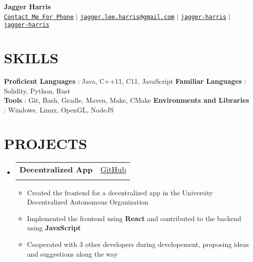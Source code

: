 \documentclass[letterpaper,11pt]{article}
\makeatletter
\newcommand{\resumeItem}[1]{
  \item\small{
    {#1 \vspace{-1pt}}
  }
}
\newcommand{\resumeProjectHeading}[4]{
  \vspace{-1pt}\item
    \begin{tabular*}{\textwidth}[t]{l@{\extracolsep{\fill}}r}
      \textbf{#1} & {\color{dark-grey}\small #2}\vspace{1pt}\\ %
      \textit{#3} & {\color{dark-grey} \small #4}\vspace{1pt}\\ %
    \end{tabular*}\vspace{-20pt}
}
\newcommand{\resumeSubHeadingListStart}{\begin{itemize}[leftmargin=0in, label={}]}
\newcommand{\resumeSubHeadingListEnd}{\end{itemize}}
\newcommand{\resumeItemListStart}{\begin{itemize}\setlength{\itemindent}{-1em}}
\newcommand{\resumeItemListEnd}{\end{itemize}\vspace{0pt}}
\makeatother
\begin{document}
\begin{center}
	\textbf{\Huge Jagger Harris} \\ \vspace{5pt}
  \small \faPhone* \texttt{\href{tel:+1555-555-5555}{Contact Me For Phone}} \hspace{1pt} $|$
	\hspace{1pt} \faEnvelope \hspace{2pt} \texttt{\href{mailto:jagger.lee.harris@gmail.com}{jagger.lee.harris@gmail.com}} \hspace{1pt} $|$
	\hspace{1pt} \faGithub \hspace{2pt} \texttt{\href{https://github.com/jagger-harris}{jagger-harris}} \hspace{1pt} $|$
	\hspace{1pt} \faLinkedin \hspace{2pt} \texttt{\href{https://www.linkedin.com/in/jagger-harris/}{jagger-harris}} \hspace{1pt}
	\\ \vspace{-3pt}
\end{center}

\section{SKILLS}
\begin{itemize}[leftmargin=0in, label={}]
	\small{\item{
		\textbf{Proficient Languages} {: Java, C++11, C11, JavaScript}\vspace{2pt}
		\hfill
		\textbf{Familiar Languages} {: Solidity, Python, Rust}\vspace{2pt} \\
		\textbf{Tools}     {: Git, Bash, Gradle, Maven, Make, CMake}
    \hfill
    \textbf{Environments and Libraries}     {: Windows, Linux, OpenGL, NodeJS}
	}}
\end{itemize}

\section{PROJECTS}
\resumeSubHeadingListStart
\resumeProjectHeading
{Decentralized App}{\href{https://github.com/UniversityDAO/udao}{GitHub}}
{}{}
\resumeItemListStart
\resumeItem{Created the frontend for a decentralized app in the University Decentralized Autonomous Organization}
\resumeItem{Implemented the frontend using \textbf{React} and contributed to the backend using \textbf{JavaScript}}
\resumeItem{Cooperated with 3 other developers during developement, proposing ideas and suggestions along the way}
\resumeItemListEnd
\resumeSubHeadingListEnd
\end{document}

